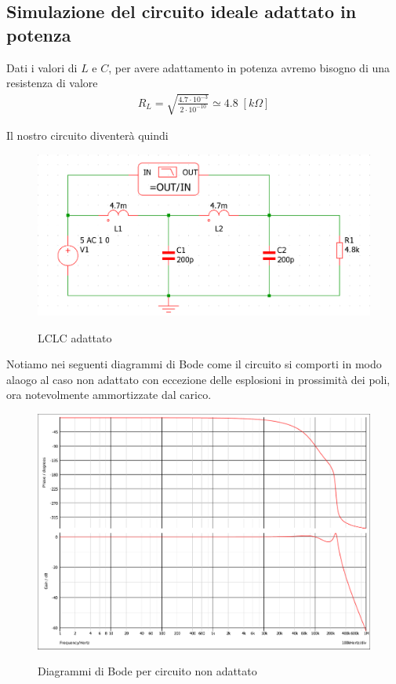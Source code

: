 \documentclass[a4paper,12pt]{report}
\begin{document}
\clearpage


\subsection{Simulazione del circuito ideale adattato in potenza}

Dati i valori di $L$ e $C$, per avere adattamento in potenza avremo bisogno di una resistenza di valore
\begin{align}
R_L = \sqrt{\frac{4.7 \cdot 10^{-3}}{2 \cdot 10^{-10}}} \simeq 4.8 \; [k\Omega]
\end{align}

Il nostro circuito diventerà quindi
\begin{figure}[!htb]
	\centering
	\includegraphics[width=\textwidth]{pictures/schemaideale_vero_adattato.png}
	\label{fig:largenenough}
	\caption{\label{lul} \small LCLC adattato}
\end{figure}

Notiamo nei seguenti diagrammi di Bode come il circuito si comporti in modo alaogo al caso non adattato con eccezione delle esplosioni in prossimità dei poli, ora notevolmente ammortizzate dal carico.

\begin{figure}[!htb]
	\centering
	\includegraphics[width=.8\textwidth]{pictures/LCLC_adattato.pdf}
	\label{fig:largenenough}
	\caption{\label{lul} \small Diagrammi di Bode per circuito non adattato}
\end{figure}
\end{document}
